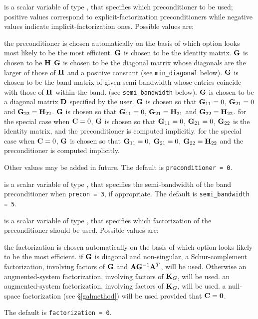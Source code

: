\documentclass{galahad}
\begin{document}
\begin{description}
 is a scalar variable of type \integer,
that specifies which preconditioner to be used;
positive values correspond to explicit-factorization preconditioners
while negative values indicate implicit-factorization ones. Possible values are:

\begin{description}
 the preconditioner is chosen automatically on the basis of which option
        looks most likely to be the most efficient.
 ${\mathbf{G}}$ is chosen to be the identity matrix.
 ${\mathbf{G}}$ is chosen to be ${\mathbf{H}}$
 ${\mathbf{G}}$ is chosen to be the diagonal matrix whose diagonals
        are the larger of those of ${\mathbf{H}}$ and a positive constant
        (see {\tt min\_diagonal} below).
 ${\mathbf{G}}$ is chosen to be the band matrix of given semi-bandwidth
        whose entries coincide with those of ${\mathbf{H}}$ within the band.
        (see {\tt semi\_bandwidth} below).
 ${\mathbf{G}}$ is chosen to be a diagonal matrix ${\mathbf{D}}$ specified by the
        user.
 ${\mathbf{G}}$ is chosen so that ${\mathbf{G}}_{11} = 0$, ${\mathbf{G}}_{21} = 0$
        and ${\mathbf{G}}_{22} = {\mathbf{H}}_{22}$.
 ${\mathbf{G}}$ is chosen so that ${\mathbf{G}}_{11} = 0$, ${\mathbf{G}}_{21} = {\mathbf{H}}_{21}$
        and ${\mathbf{G}}_{22} = {\mathbf{H}}_{22}$.
 for the special case when ${\mathbf{C}} = 0$,
        ${\mathbf{G}}$ is chosen so that ${\mathbf{G}}_{11} = 0$, ${\mathbf{G}}_{21} = 0$,
        ${\mathbf{G}}_{22}$ is the identity matrix, and the preconditioner is computed
        implicitly.
 for the special case when ${\mathbf{C}} = 0$,
        ${\mathbf{G}}$ is chosen so that ${\mathbf{G}}_{11} = 0$, ${\mathbf{G}}_{21} = 0$,
        ${\mathbf{G}}_{22} = {\mathbf{H}}_{22}$ and the preconditioner is computed
        implicitly.
\end{description}
Other values may be added in future.
The default is {\tt preconditioner = 0}.

 is a scalar variable of type \integer, that
specifies the semi-bandwidth of the band preconditioner when {\tt precon = 3},
if appropriate.
The default is {\tt semi\_bandwidth = 5}.

 is a scalar variable of type \integer, that
specifies which factorization of the preconditioner should be used.
Possible values are:

\begin{description}
 the factorization is chosen automatically on the basis of which option
        looks likely to be the most efficient.
 if ${\mathbf{G}}$ is diagonal and non-singular, a Schur-complement
        factorization, involving factors of ${\mathbf{G}}$ and ${\mathbf{A}} {\mathbf{G}}^{-1} {\mathbf{A}}^T$,
        will be used. Otherwise an augmented-system factorization, involving
        factors of ${\mathbf{K}}_G$, will be used.
 an augmented-system factorization, involving factors of ${\mathbf{K}}_G$,
        will be used.
 a null-space factorization (see \S\ref{galmethod}) will be used
provided that ${\mathbf{C}} = {\mathbf{0}}$.
\end{description}
The default is {\tt factorization = 0}.


\end{description}
\end{document}
